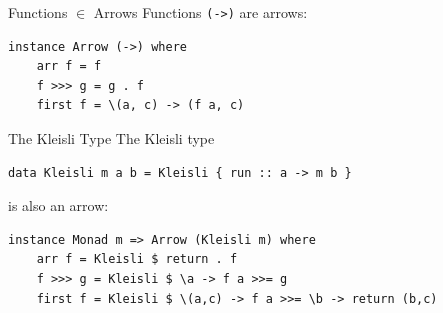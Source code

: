 \begin{frame}[fragile]{Functions $\in$ Arrows}
Functions \lstinline{(->)} are arrows:
\begin{lstlisting}[frame=htrbl]
instance Arrow (->) where
	arr f = f
	f >>> g = g . f
	first f = \(a, c) -> (f a, c)
\end{lstlisting}
\end{frame}

\begin{frame}[fragile]{The Kleisli Type}
The Kleisli type
\begin{lstlisting}[frame=htrbl]
data Kleisli m a b = Kleisli { run :: a -> m b }
\end{lstlisting}
is also an arrow:
\begin{lstlisting}[frame=htrbl]
instance Monad m => Arrow (Kleisli m) where
	arr f = Kleisli $ return . f
	f >>> g = Kleisli $ \a -> f a >>= g
	first f = Kleisli $ \(a,c) -> f a >>= \b -> return (b,c)
\end{lstlisting}
\end{frame}


